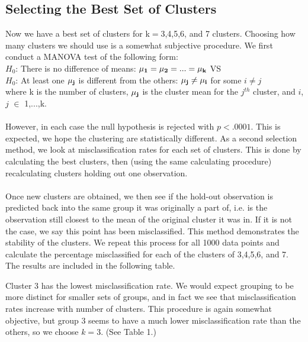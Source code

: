 \documentclass[11pt]{article}
\begin{document}
\subsection*{Selecting the Best Set of Clusters}
Now we have a best set of clusters for k$=$3,4,5,6, and 7 clusters. Choosing how many clusters we should use is a somewhat subjective procedure. We first conduct a MANOVA test of the following form: 
\\
\indent $H_0$: There is no difference of means: $\bf{\mu}_{1} = \bf{\mu}_{2} = ... = \bf{\mu}_{k}$ VS 
\\
\indent $H_0$: At least one $\bf{\mu}_{j}$ is different from the others: $\bf{\mu}_{j} \ne \bf{\mu}_{i}$ for some $i \ne j$
\\
where k is the number of clusters, $\bf{\mu}_{j}$ is the cluster mean for the $j^{th}$ cluster, and $i$, $j$ $\in$ 1,...,k.
\\
\\ 
However, in each case the null hypothesis is rejected with $p<.0001$. This is expected, we hope the clustering are statistically different. As a second selection method, we look at misclassification rates for each set of clusters. This is done by calculating the best clusters, then (using the same calculating procedure) recalculating clusters holding out one observation. 
\\
\\
Once new clusters are obtained, we then see if the hold-out observation is predicted back into the same group it was originally a part of, i.e. is the observation still closest to the mean of the original cluster it was in. If it is not the case, we say this point has been misclassified. This method demonstrates the stability of the clusters. We repeat this process for all 1000 data points and calculate the percentage misclassified for each of the clusters of 3,4,5,6, and 7. The results are included in the following table.


\noindent Cluster 3 has the lowest misclassification rate. We would expect grouping to be more distinct for smaller sets of groups, and in fact we see that misclassification rates increase with number of clusters. This procedure is again somewhat objective, but group 3 seems to have a much lower misclassification rate than the others, so we choose $k=3$. (See Table 1.)

\end{document}
